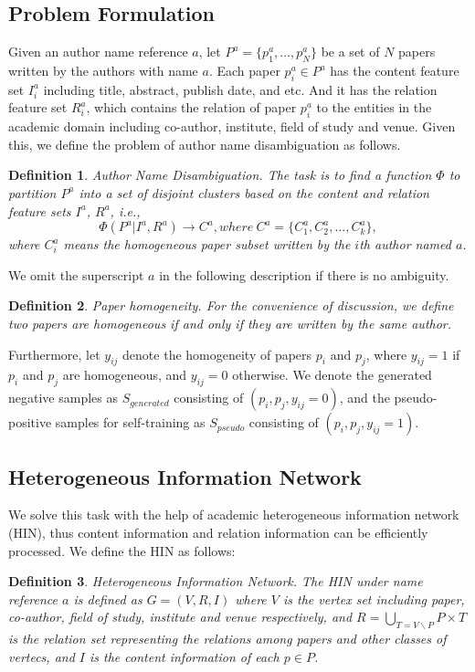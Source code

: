 \documentclass[letterpaper]{article}
\newtheorem{mydef}{Definition}
\begin{document}
\subsection{Problem Formulation}
Given an author name reference $a$, let $P^a =\{p^a_1, \dots, p^a_N\}$ be a set of $N$ papers written by the authors with name $a$.
Each paper $p_i^a \in P^a$ has the content feature set $I_i^a$ including title, abstract, publish date, and etc.
And it has the relation feature set $R_i^a$, which contains the relation of paper $p^a_i$ to the entities in the academic domain including co-author, institute, field of study and venue.
Given this, we define the problem of author name disambiguation as follows.
\begin{mydef}
Author Name Disambiguation. The task is to find a function $\Phi$ to partition $P^a$ into a set of disjoint clusters based on the content and relation feature sets $I^a$, $R^a$, i.e.,
$$\Phi(P^a|I^a, R^a) \to C^a, where \ C^a =\{C^a_1, C^a_2, \dots, C^a_k\},$$
where $C^a_i$ means the homogeneous paper subset written by the $i$th author named $a$.
\vspace*{2pt}
\end{mydef}
We omit the superscript $a$ in the following description if there is no ambiguity.
\begin{mydef}
Paper homogeneity. For the convenience of discussion, we define two papers are homogeneous if and only if they are written by the same author.
\end{mydef}
Furthermore, let $y_{ij}$ denote the homogeneity of papers $p_i$ and $p_j$, where $y_{ij}=1$ if $p_i$ and $p_j$ are homogeneous, and $y_{ij}=0$ otherwise.
We denote the generated negative samples as $S_{generated}$ consisting of $(p_i, p_j, y_{ij}=0)$, and the pseudo-positive samples for self-training as $S_{pseudo}$ consisting of $(p_i, p_j, y_{ij}=1)$.

\subsection{Heterogeneous Information Network}
We solve this task with the help of academic heterogeneous information network (HIN), thus content information and relation information can be efficiently processed.
We define the HIN as follows:
\begin{mydef}
Heterogeneous Information Network. The HIN under name reference $a$ is defined as $G = (V, R, I)$ where $V$ is the vertex set including paper, co-author, field of study, institute and venue respectively, and $R=\bigcup _{T = V \backslash P} P \times T $ is the relation set representing the relations among papers and other classes of vertecs, and $I$ is the content information of each $p\in P$.
\end{mydef}
\end{document}
